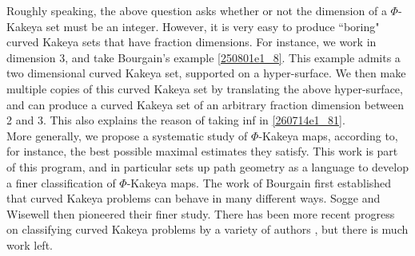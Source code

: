 \documentclass{article}
\numberwithin{equation}{section}
\theoremstyle{plain}
\begin{document}
Roughly speaking, the above question  asks whether or not the dimension of a $\Phi$-Kakeya set must be an integer. However, it is very easy to produce ``boring" curved Kakeya sets that have fraction dimensions. For instance, we work in dimension 3, and take Bourgain's example \eqref{250801e1_8}. This example admits a two dimensional curved Kakeya set, supported on a hyper-surface. We then make multiple copies of this curved Kakeya set by translating the above hyper-surface, and can produce a curved Kakeya set of an arbitrary fraction dimension between 2 and 3. This also explains the reason of taking inf in \eqref{260714e1_81}. \\
















More generally, we propose a systematic study of $\Phi$-Kakeya maps, according to, for instance, the best possible maximal estimates they satisfy. This work is part of this program, and in particular sets up path geometry as a language to develop a finer classification of $\Phi$-Kakeya maps. The work of Bourgain \cite{Bou91} first established that curved Kakeya problems can behave in many different ways. Sogge \cite{Sog99} and Wisewell \cite{Wis03,Wis05} then pioneered their finer study. There has been more recent progress on classifying curved Kakeya problems by a variety of authors \cite{HI22,GWZ24,DGGZ24,CGGHIW24,nadjimzadah2025newcurvedkakeyaestimates,nadjimzadah2026bourgainsconditionstickykakeya}, but there is much work left. 
\end{document}
